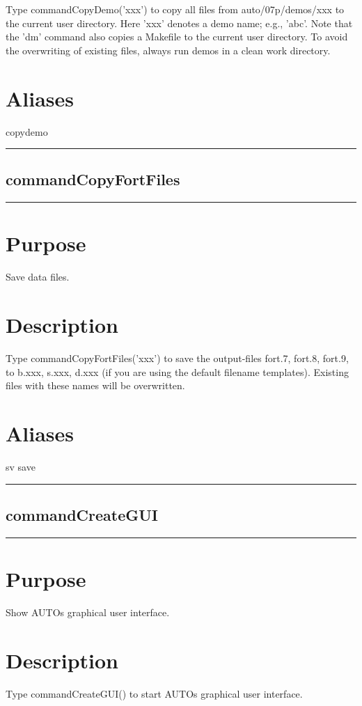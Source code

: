 \documentclass[12pt]{report}
\begin{document}
\begin{minipage}{6in}
    Type commandCopyDemo('xxx') to copy all files from auto/07p/demos/xxx to the
    current user directory.  Here 'xxx' denotes a demo name; e.g.,
    'abc'.  Note that the 'dm' command also copies a Makefile to the
    current user directory. To avoid the overwriting of existing
    files, always run demos in a clean work directory.
    \section*{Aliases}
copydemo \medskip\hrule\end{minipage}\subsection{commandCopyFortFiles} \label{sec:clui_ref_commandCopyFortFiles}\begin{minipage}{6in}\hrule\medskip\section*{Purpose}
Save data files.\section*{Description}

    Type commandCopyFortFiles('xxx') to save the output-files fort.7, fort.8, fort.9,
    to b.xxx, s.xxx, d.xxx (if you are using the default filename
    templates).  Existing files with these names will be overwritten.
    \section*{Aliases}
sv save \medskip\hrule\end{minipage}\subsection{commandCreateGUI} \label{sec:clui_ref_commandCreateGUI}\begin{minipage}{6in}\hrule\medskip\section*{Purpose}
Show AUTOs graphical user interface.\section*{Description}

    Type commandCreateGUI() to start AUTOs graphical user interface.
    

\end{minipage}
\end{document}
